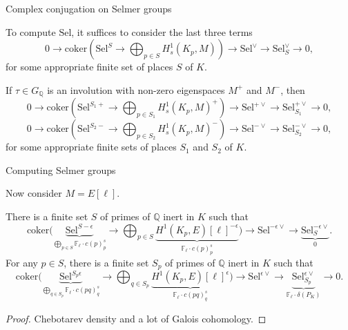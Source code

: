 \documentclass[10pt]{beamer}
\begin{document}
\begin{frame}[t]{Complex conjugation on Selmer groups}

To compute $ \mathrm{Sel} $, it suffices to consider the last three terms
$$ 0 \to \mathrm{coker}\left(\mathrm{Sel}^S \to \displaystyle\bigoplus_{p \in S} H_s^1(K_p, M)\right) \to \mathrm{Sel}^\vee \to \mathrm{Sel}_S^\vee \to 0, $$
for some appropriate finite set of places $ S $ of $ K $.

\vspace{0.5cm} If $ \tau \in G_\mathbb{Q} $ is an involution with non-zero eigenspaces $ M^+ $ and $ M^- $, then
$$ 0 \to \mathrm{coker}\left(\mathrm{Sel}^{S_1+} \to \displaystyle\bigoplus_{p \in S_1} H_s^1(K_p, M)^+\right) \to \mathrm{Sel}^{+\vee} \to \mathrm{Sel}_{S_1}^{+\vee} \to 0, $$
$$ 0 \to \mathrm{coker}\left(\mathrm{Sel}^{S_2-} \to \displaystyle\bigoplus_{p \in S_2} H_s^1(K_p, M)^-\right) \to \mathrm{Sel}^{-\vee} \to \mathrm{Sel}_{S_2}^{-\vee} \to 0, $$
for some appropriate finite sets of places $ S_1 $ and $ S_2 $ of $ K $.

\end{frame}

\begin{frame}[t]{Computing Selmer groups}

Now consider $ M = E[\ell] $.

\begin{corollary}
There is a finite set $ S $ of primes of $ \mathbb{Q} $ inert in $ K $ such that
$$ \mathrm{coker}\Biggl(\underbrace{\mathrm{Sel}^{S-\epsilon}}_{\bigoplus_{p \in S} \mathbb{F}_\ell \cdot c(p)_p^s} \to \bigoplus_{p \in S} \underbrace{H^1(K_p, E)[\ell]^{-\epsilon}}_{\mathbb{F}_\ell \cdot c(p)_p^s}\Biggr) \to \mathrm{Sel}^{-\epsilon\vee} \to \underbrace{\mathrm{Sel}_S^{-\epsilon\vee}}_0. $$
For any $ p \in S $, there is a finite set $ S_p $ of primes of $ \mathbb{Q} $ inert in $ K $ such that
$$ \mathrm{coker}\Biggl(\underbrace{\mathrm{Sel}^{S_p\epsilon}}_{\bigoplus_{q \in S_p} \mathbb{F}_\ell \cdot c(pq)_q^s} \to \bigoplus_{q \in S_p} \underbrace{H^1(K_p, E)[\ell]^\epsilon}_{\mathbb{F}_\ell \cdot c(pq)_q^s}\Biggr) \to \mathrm{Sel}^{\epsilon\vee} \to \underbrace{\mathrm{Sel}_{S_p}^{\epsilon\vee}}_{\mathbb{F}_\ell \cdot \delta(P_K)} \to 0. $$
\vspace{-0.5cm}
\end{corollary}

\begin{proof}
Chebotarev density and a lot of Galois cohomology.
\end{proof}

\end{frame}
\end{document}
